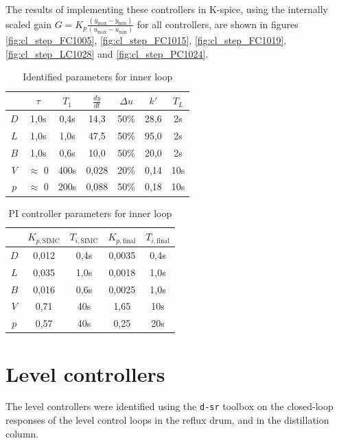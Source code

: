 \documentclass[12pt]{article}
\begin{document}
The results of implementing these controllers in K-spice, using the internally scaled gain $G = K_p \frac{(y_{\max} - y_{\min})}{(u_{\max} - u_{\min})}$ for all controllers, are shown in figures \ref{fig:cl_step_FC1005}, \ref{fig:cl_step_FC1015}, \ref{fig:cl_step_FC1019}, \ref{fig:cl_step_LC1028} and \ref{fig:cl_step_PC1024}.


\begin{table}
\centering
\begin{tabular}{c | c | c | c | c | c || c}
& $\tau$ & $T_1$ & $\frac{dy}{dt}$ & $\Delta u$ & $k'$ & $T_L$ \\ \hline
$D$ & 1,0s & 0,4s & 14,3 & 50\% & 28,6 & 2s \\
$L$ & 1,0s & 1,0s & 47,5 & 50\% & 95,0 & 2s \\
$B$ & 1,0s & 0,6s & 10,0 & 50\% & 20,0 & 2s \\
$V$ & $\approx$ 0 & 400s & 0,028 & 20\% & 0,14 & 10s \\
$p$ & $\approx$ 0 & 200s & 0,088 & 50\% & 0,18 & 10s
\end{tabular}
\caption{Identified parameters for inner loop}
\label{tab:inner_loop_step_responses}
\end{table}

\begin{table}
\centering
\begin{tabular}{c | c | c : c | c}
& $K_{p, \textrm{SIMC}}$ & $T_{i, \textrm{SIMC}}$ & $K_{p, \textrm{final}}$ & $T_{i, \textrm{final}}$ \\ \hline
$D$ & 0,012 & 0,4s & 0,0035 & 0,4s\\
$L$ &  0,035 & 1,0s & 0,0018 & 1,0s \\
$B$ & 0,016 & 0,6s & 0,0025 & 1,0s \\
$V$ & 0,71 & 40s & 1,65 & 10s \\
$p$ & 0,57 & 40s & 0,25 & 20s
\end{tabular}
\caption{PI controller parameters for inner loop}
\label{tab:inner_loop_PI_parameters}
\end{table}


\newpage
\section{Level controllers}
The level controllers were identified using the \texttt{d-sr} toolbox on the closed-loop responses of the level control loops in the reflux drum, and in the distillation column.
\end{document}
